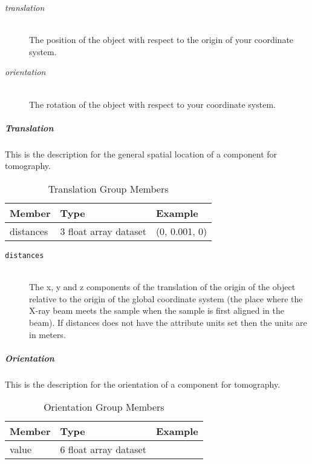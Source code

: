 \begin{description}
\item[\emph{translation}] \hfill \\
{The position of the object with respect to the origin of your coordinate system.}

\item[\emph{orientation}] \hfill \\
{The rotation of the object with respect to your coordinate system.}
\end{description}

\subparagraph{Translation}
\label{tomo:translation}

This is the description for the general spatial location of a component for tomography.

\begin{table}[h!]\sffamily \footnotesize
\centering
\caption{Translation Group Members}
\label{tomo:translation}
\begin{tabular}{l l l}
\toprule
\bfseries Member     & \bfseries Type & \bfseries Example \\
\midrule

distances & 3 float array dataset & (0, 0.001, 0) \\
\bottomrule
\end{tabular}
\end{table}

\begin{description}
\item[\tt {distances}] \hfill \\
{The x, y and z components of the translation of the origin of the object
relative to the origin of the global coordinate system (the place where 
the X-ray beam  meets the sample when the sample is first aligned in the beam).
If  distances does not have the attribute units set then the units are in
meters.}
\end{description}

\normalsize

\subparagraph{Orientation}
\label{tomo:orientation}

This is the description for the orientation of a component for tomography.

\begin{table}[h!]\sffamily \footnotesize
\centering
\caption{Orientation Group Members}
\begin{tabular}{l l l}
\toprule
\bfseries Member     & \bfseries Type & \bfseries Example \\
\midrule

value & 6 float array dataset & \\

\bottomrule
\end{tabular}
\end{table}

